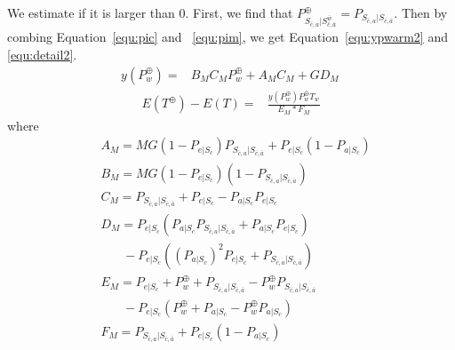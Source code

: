 We estimate if it is larger than $0$.
First, we find that $P_{S_{\bar{c}, a}|S_{\bar{c},\bar{a}}^{\bar{w}}}^{\oplus} = P_{S_{\bar{c}, a}|S_{\bar{c},\bar{a}}}$.
Then by combing Equation~\ref{equ:pic} and ~\ref{equ:pim}, we get Equation~\ref{equ:ypwarm2} and \ref{equ:detail2}.
\begin{equation}
\label{equ:ypwarm2}
\begin{split}
y(P_{w}^{\oplus}) = &B_{M}C_{M}P_{w}^{\oplus}+A_{M}C_{M}+GD_{M} \,
\end{split}\end{equation}
\begin{equation}
\label{equ:detail2}
\begin{split}
E(T^{\oplus}) - E(T) = &\frac{y(P_{w}^{\oplus})P_{w}^{\oplus}T_{w}}{E_{M}*F_{M}}
\end{split}\end{equation}
where
\begin{equation*}
\begin{split}
&A_{M}= MG(1-P_{e|S_{c}})P_{S_{\bar{c}, a}|S_{\bar{c},\bar{a}}}+P_{e|S_{c}}(1-P_{a|S_{c}})\\
&B_{M}=MG(1-P_{e|S_{c}})(1-P_{S_{\bar{c}, a}|S_{\bar{c},\bar{a}}})\\
&C_{M}=P_{S_{\bar{c}, a}|S_{\bar{c},\bar{a}}}+P_{e|S_{c}}-P_{a|S_{c}}P_{e|S_{c}}\\
&D_{M}=P_{e|S_{c}}(P_{a|S_{c}}P_{S_{\bar{c}, a}|S_{\bar{c},\bar{a}}}+P_{a|S_{c}}P_{e|S_{c}}) \\
& \ \ \ \ \ \ \ \ -P_{e|S_{c}}((P_{a|S_{c}})^2P_{e|S_{c}}+P_{S_{\bar{c}, a}|S_{\bar{c},\bar{a}}})\\
&E_{M}=P_{e|S_{c}}+P_{w}^{\oplus}+P_{S_{\bar{c}, a}|S_{\bar{c},\bar{a}}}-P_{w}^{\oplus}P_{S_{\bar{c}, a}|S_{\bar{c},\bar{a}}} \\& \ \ \ \ \ \ \ \ -P_{e|S_{c}}(P_{w}^{\oplus}+P_{a|S_{c}}-P_{w}^{\oplus}P_{a|S_{c}})\\
&F_{M}=P_{S_{\bar{c}, a}|S_{\bar{c},\bar{a}}}+P_{e|S_{c}}(1-P_{a|S_{c}})
\end{split}\end{equation*}

